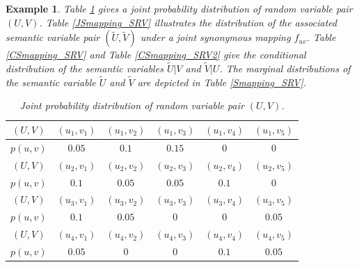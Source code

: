 \documentclass[12pt, draftclsnofoot,onecolumn]{IEEEtran}
\newtheorem{example}{\bf{Example}}
\begin{document}
\begin{example}
Table \ref{JPDF_RV} gives a joint probability distribution of random variable pair $(U,V)$. Table \ref{JSmapping_SRV} illustrates the distribution of the associated semantic variable pair $(\tilde{U},\tilde{V})$ under a joint synonymous mapping $f_{uv}$. Table \ref{CSmapping_SRV} and Table \ref{CSmapping_SRV2} give the conditional distribution of the semantic variables $\tilde{U}|V$ and $\tilde{V}|U$. The marginal distributions of the semantic variable $\tilde{U}$ and $\tilde{V}$ are depicted in Table \ref{Smapping_SRV}.

\begin{table}[htbp]
\centering
\caption{Joint probability distribution of random variable pair $(U,V)$.} \label{JPDF_RV}
\begin{tabular}{|c|c|c|c|c|c|}
  \hline $(U,V)$     & $(u_1,v_1)$ &  $(u_1,v_2)$  & $(u_1,v_3)$ & $(u_1,v_4)$  & $(u_1,v_5)$  \\
  \hline $p(u,v)$     &   $0.05$       &       $0.1$       &    $0.15$      &       $0$         &       $0$         \\
  \hline $(U,V)$      & $(u_2,v_1)$ &  $(u_2,v_2)$  & $(u_2,v_3)$ & $(u_2,v_4)$  & $(u_2,v_5)$  \\
  \hline $p(u,v)$     &     $0.1$       &     $0.05$       &    $0.05$      &     $0.1$        &       $0$         \\
  \hline $(U,V)$     & $(u_3,v_1)$ &  $(u_3,v_2)$  & $(u_3,v_3)$ & $(u_3,v_4)$  & $(u_3,v_5)$  \\
  \hline $p(u,v)$     &     $0.1$       &     $0.05$       &        $0$       &       $0$         &      $0.05$     \\
  \hline $(U,V)$     & $(u_4,v_1)$ &  $(u_4,v_2)$  & $(u_4,v_3)$ & $(u_4,v_4)$  & $(u_4,v_5)$  \\
  \hline $p(u,v)$     &   $0.05$       &       $0$          &        $0$       &     $0.1$        &      $0.05$     \\
  \hline
\end{tabular}
\end{table}


\end{example}
\end{document}

